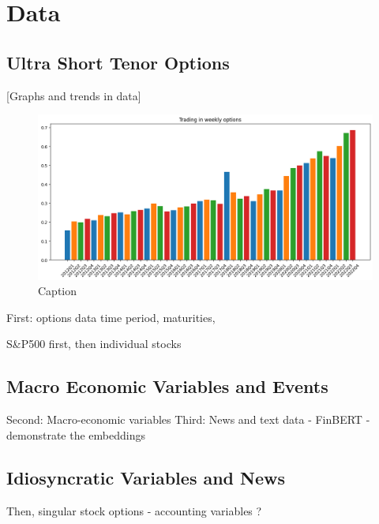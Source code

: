 \section{Data} \label{Data}

\subsection{Ultra Short Tenor Options} \label{3_ultra_short_tenor}
[Graphs and trends in data]

\begin{figure}
    \centering
    \includegraphics[width=\linewidth]{report/option_volume.png}
    \caption{Caption}
    \label{fig:enter-label}
\end{figure}
First: options data
time period, maturities, 

S\&P500 first, then individual stocks

\subsection{Macro Economic Variables and Events} \label{3_macro_data}
Second: Macro-economic variables 
Third: News and text data - FinBERT - demonstrate the embeddings

\subsection{Idiosyncratic Variables and News} \label{3_stock_data}

Then, singular stock options
- accounting variables ?